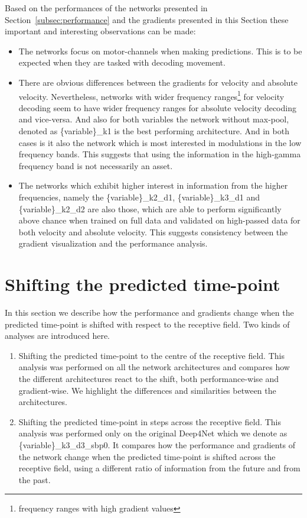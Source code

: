 Based on the performances of the networks presented in Section~\ref{subsec:performance} and the gradients presented in this Section these important and interesting observations can be made:

\begin{itemize}
    \item The networks focus on motor-channels when making predictions.
This is to be expected when they are tasked with decoding movement.
    \item There are obvious differences between the gradients for velocity and absolute velocity.
    Nevertheless, networks with wider frequency ranges\footnote{frequency ranges with high gradient values} for velocity decoding seem to have wider frequency ranges for absolute velocity decoding and vice-versa.
    And also for both variables the network without max-pool, denoted as \{variable\}\_k1 is the best performing architecture.
    And in both cases is it also the network which is most interested in modulations in the low frequency bands.
    This suggests that using the information in the high-gamma frequency band is not necessarily an asset.
    \item The networks which exhibit higher interest in information from the higher frequencies, namely the \{variable\}\_k2\_d1, \{variable\}\_k3\_d1 and \{variable\}\_k2\_d2 are also those, which are able to perform significantly above chance when trained on full data and validated on high-passed data for both velocity and absolute velocity.
    This suggests consistency between the gradient visualization and the performance analysis.

\end{itemize}


\section{Shifting the predicted time-point}\label{sec:shifting-the-predicted-time-point}
In this section we describe how the performance and gradients change when the predicted time-point is shifted with respect to the receptive field.
Two kinds of analyses are introduced here.

\begin{enumerate}
    \item Shifting the predicted time-point to the centre of the receptive field.
This analysis was performed on all the network architectures and compares how the different architectures react to the shift, both performance-wise and gradient-wise.
We highlight the differences and similarities between the architectures.
    \item Shifting the predicted time-point in steps across the receptive field.
This analysis was performed only on the original Deep4Net which we denote as \{variable\}\_k3\_d3\_sbp0.
It compares how the performance and gradients of the network change when the predicted time-point is shifted across the receptive field, using a different ratio of information from the future and from the past.
\end{enumerate}


